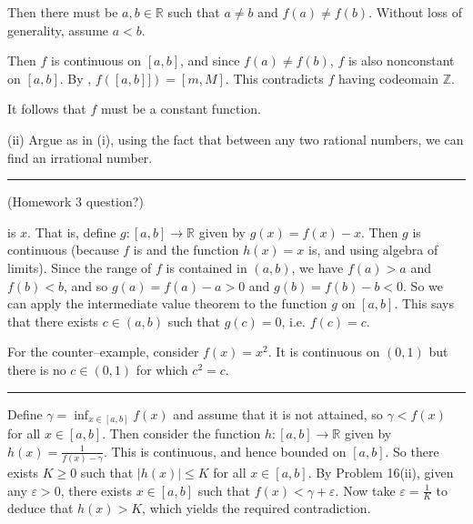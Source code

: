 \documentclass[letterpaper,10pt,english]{jupyterBook}
\begin{document}
\sphinxAtStartPar
Then there must be \(a,b\in\mathbb{R}\) such that \(a\neq b\) and \(f(a)\neq f(b)\). Without loss of generality, assume \(a<b\).

\sphinxAtStartPar
Then \(f\) is continuous on \([a,b]\), and since \(f(a)\neq f(b)\), \(f\) is also non\sphinxhyphen{}constant on \([a,b]\). By , \(f([a,b]])=[m,M]\). This contradicts \(f\) having codeomain \(\mathbb{Z}\).

\sphinxAtStartPar
It follows that \(f\) must be a constant function.

\sphinxAtStartPar
(ii) Argue as in (i), using the fact that between any two rational numbers, we can find an irrational number.


\bigskip\hrule\bigskip


\sphinxAtStartPar
{\hyperref[\detokenize{Problems:id26}]{}} (Homework 3 question?)

 is \(x\). That is, define \(g:[a,b]\to\mathbb{R}\) given by \(g(x) = f(x) - x\). Then \(g\) is continuous (because \(f\) is and the function \(h(x)=x\) is, and using algebra of limits). Since the range of \(f\) is contained in \((a, b)\), we have \(f(a) > a\) and \(f(b) < b\), and so \(g(a) = f(a) - a > 0\) and \(g(b) = f(b) - b < 0\). So we can apply the intermediate value theorem to the function \(g\) on \([a,b]\). This says that there exists \(c \in (a, b)\) such that \(g(c) = 0\), i.e. \(f(c) = c\).

For the counter–example, consider \(f(x) = x^2\). It is continuous on \((0, 1)\) but there is no \(c \in (0, 1)\) for which \(c^2 = c\).


\bigskip\hrule\bigskip


\sphinxAtStartPar
{\hyperref[\detokenize{Problems:id27}]{}} Define \(\gamma = \inf_{x \in [a, b]}f(x)\) and assume that it is not attained, so \(\gamma < f(x)\) for all \(x \in [a,b]\). Then consider the function \(h:[a,b]\to \mathbb{R}\) given by \(h(x) = \displaystyle\frac{1}{f(x) - \gamma}\). This is continuous, and hence bounded on \([a, b]\). So there exists \(K \geq 0\) such that \(|h(x)| \leq K\) for all \(x \in [a, b]\). By Problem 16(ii), given any \(\varepsilon > 0\), there exists \(x \in [a, b]\) such that \(f(x) < \gamma + \varepsilon\). Now take \(\varepsilon = \frac{1}{K}\) to deduce that \(h(x) > K\), which yields the required contradiction.
\end{document}

